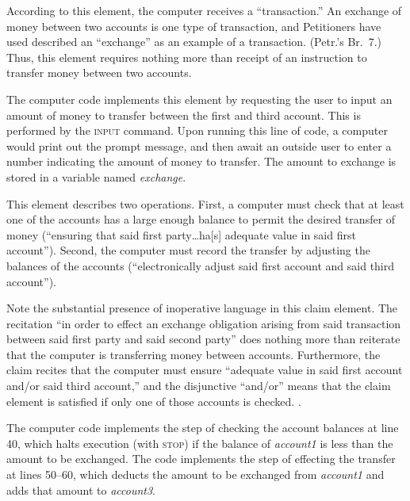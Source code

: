 \documentclass{scotus}
\begin{document}

According to this element, the computer receives a ``transaction.'' An exchange
of money between two accounts is one type of transaction, and Petitioners have
used described an ``exchange'' as an example of a transaction. (Petr.'s Br.\ 7.)
Thus, this
element requires nothing more than receipt of an instruction to transfer money
between two accounts.

The computer code implements this element by requesting the user to input an
amount of money to
transfer between the first and third account. This is performed by the
\textsc{input} command. Upon running this line of code,
a computer would print out the prompt message, and then await an outside user to
enter a number indicating the amount of money to transfer. The amount to
exchange is stored in a variable named \emph{exchange}.


This element describes two operations. First, a computer must check that at
least one of the accounts has a large enough balance to permit the desired
transfer of money (``ensuring that said first party\ldots ha[s] adequate value
in
said first account''). Second, the computer must record the transfer by
adjusting the balances of the accounts (``electronically adjust said first
account and said third account'').

Note the substantial presence of inoperative language in this claim element. The
recitation ``in order to effect an exchange obligation arising from said
transaction between said first party and said second party'' does nothing more
than reiterate that the computer is transferring money between accounts.
Furthermore, the claim recites that the computer must ensure ``adequate value in
said first account and/or said third account,'' and the disjunctive ``and/or''
means that the claim element is satisfied if only one of those accounts is
checked. .

The computer code implements the step of checking the account balances at line
40, which halts execution (with \textsc{stop}) if the balance of
\emph{account1} is less than the amount to be exchanged. The code implements the
step of effecting the transfer at lines 50--60, which deducts the amount to be
exchanged from \emph{account1} and adds that amount to \emph{account3}.
\end{document}
